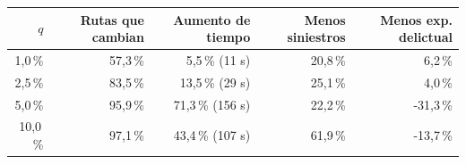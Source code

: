 \begin{tabular}{rrrrr}
\toprule
$q$ & Rutas que cambian & Aumento de tiempo & Menos siniestros & Menos exp. delictual \\
\midrule
1,0\,\% & 57,3\,\% & 5,5\,\% (11 s) & 20,8\,\% & 6,2\,\% \\
2,5\,\% & 83,5\,\% & 13,5\,\% (29 s) & 25,1\,\% & 4,0\,\% \\
5,0\,\% & 95,9\,\% & 71,3\,\% (156 s) & 22,2\,\% & -31,3\,\% \\
10,0\,\% & 97,1\,\% & 43,4\,\% (107 s) & 61,9\,\% & -13,7\,\% \\
\bottomrule
\end{tabular}
